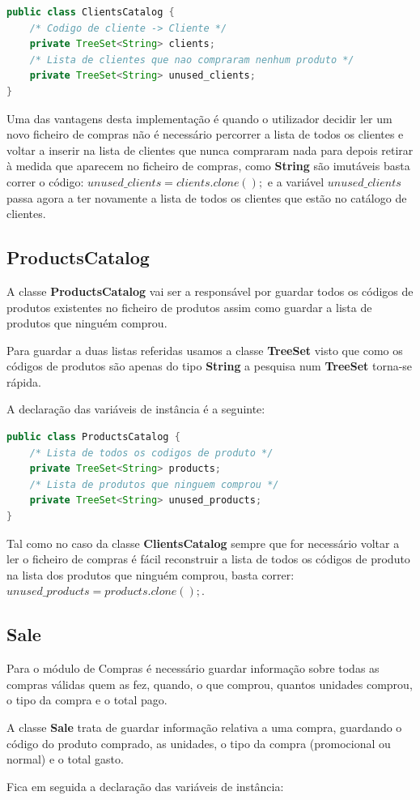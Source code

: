 \documentclass[10pt] {article}
\begin{document}
\begin{lstlisting}[language=Java]
public class ClientsCatalog {
	/* Codigo de cliente -> Cliente */
	private TreeSet<String> clients;
	/* Lista de clientes que nao compraram nenhum produto */
	private TreeSet<String> unused_clients;
}
\end{lstlisting}

\par Uma das vantagens desta implementação é quando o utilizador decidir ler um novo ficheiro de compras não é necessário 
percorrer a lista de todos os clientes e voltar a inserir na lista de clientes que nunca compraram nada para depois retirar à 
medida que aparecem no ficheiro de compras, como \textbf{String} são imutáveis basta correr o código: 
$unused\_clients = clients.clone();$ e a variável $unused\_clients$ passa agora a ter novamente a lista de todos os clientes que estão no catálogo de clientes.

\subsection{ProductsCatalog}
\par A classe \textbf{ProductsCatalog} vai ser a responsável por guardar todos os códigos de produtos existentes no ficheiro de 
produtos assim como guardar a lista de produtos que ninguém comprou.
\par Para guardar a duas listas referidas usamos a classe \textbf{TreeSet} visto que como os códigos de produtos são apenas 
do tipo \textbf{String} a pesquisa num \textbf{TreeSet} torna-se rápida.
\par A declaração das variáveis de instância é a seguinte:

\begin{lstlisting}[language=Java]
public class ProductsCatalog {
	/* Lista de todos os codigos de produto */
	private TreeSet<String> products;
	/* Lista de produtos que ninguem comprou */
	private TreeSet<String> unused_products;
}
\end{lstlisting}

\par Tal como no caso da classe \textbf{ClientsCatalog} sempre que for necessário voltar a ler o ficheiro de compras é fácil 
reconstruir a lista de todos os códigos de produto na lista dos produtos que ninguém comprou, basta correr: 
$unused\_products = products.clone();$.

\newpage
\subsection{Sale}
\par Para o módulo de Compras é necessário guardar informação sobre todas as compras válidas quem as fez, quando,
o que comprou, quantos unidades comprou, o tipo da compra e o total pago.
\par A classe \textbf{Sale} trata de guardar informação relativa a uma compra, guardando o código do produto comprado, 
as unidades, o tipo da compra (promocional ou normal) e o total gasto.
\par Fica em seguida a declaração das variáveis de instância:
\end{document}
